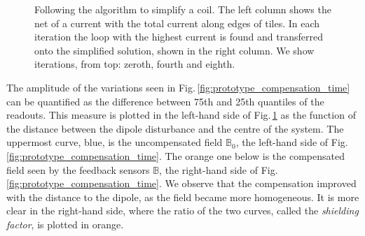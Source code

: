 \begin{figure}
  \centering
  \quad
  \caption{Following the algorithm to simplify a coil. The left column shows the net of a current with the total current along edges of tiles. In each iteration the loop with the highest current is found and transferred onto the simplified solution, shown in the right column. We show iterations, from top: zeroth, fourth and eighth.}
  \label{fig:prototype_compensation}
\end{figure}

The amplitude of the variations seen in Fig.\,\ref{fig:prototype_compensation_time} can be quantified as the difference between 75th and 25th quantiles of the readouts. This measure is plotted in the left-hand side of Fig.\,\ref{fig:prototype_compensation} as the function of the distance between the dipole disturbance and the centre of the system. The uppermost curve, blue, is the uncompensated field $\mathbb{B}_0$, the left-hand side of Fig.\,\ref{fig:prototype_compensation_time}. The orange one below is the compensated field seen by the feedback sensors $\mathbb{B}$, the right-hand side of Fig.\,\ref{fig:prototype_compensation_time}. We observe that the compensation improved with the distance to the dipole, as the field became more homogeneous. It is more clear in the right-hand side, where the ratio of the two curves, called the \emph{shielding factor}, is plotted in orange.


